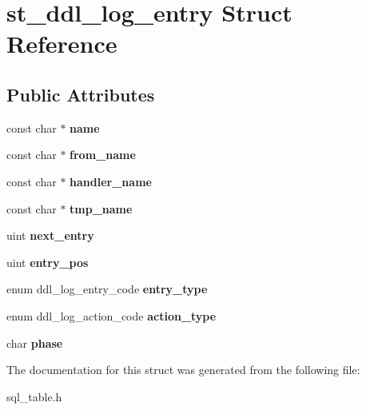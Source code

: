 \hypertarget{structst__ddl__log__entry}{}\section{st\+\_\+ddl\+\_\+log\+\_\+entry Struct Reference}
\label{structst__ddl__log__entry}
\subsection*{Public Attributes}
\begin{DoxyCompactItemize}
\item 
\mbox{\label{structst__ddl__log__entry_affc66eabbd1ef994512cfb2c076d873c}} 
const char $\ast$ {\bfseries name}
\item 
\mbox{\label{structst__ddl__log__entry_a59c9f98eacf0200a95a8aab47ca19d33}} 
const char $\ast$ {\bfseries from\+\_\+name}
\item 
\mbox{\label{structst__ddl__log__entry_a2d3a3cd5ad56b2f9d4cee7e74e20d698}} 
const char $\ast$ {\bfseries handler\+\_\+name}
\item 
\mbox{\label{structst__ddl__log__entry_a9b46a52131200b4cf8910a3834fe592c}} 
const char $\ast$ {\bfseries tmp\+\_\+name}
\item 
\mbox{\label{structst__ddl__log__entry_a0bf4caffb2a0d3ae041b2dcdb26e52e2}} 
uint {\bfseries next\+\_\+entry}
\item 
\mbox{\label{structst__ddl__log__entry_a26677cc3246dfe5613936bd9475d4711}} 
uint {\bfseries entry\+\_\+pos}
\item 
\mbox{\label{structst__ddl__log__entry_ab755812a94d5790247ed56963641647f}} 
enum ddl\+\_\+log\+\_\+entry\+\_\+code {\bfseries entry\+\_\+type}
\item 
\mbox{\label{structst__ddl__log__entry_a879f6fb99b8c21c0cec0576ef96a67b5}} 
enum ddl\+\_\+log\+\_\+action\+\_\+code {\bfseries action\+\_\+type}
\item 
\mbox{\label{structst__ddl__log__entry_a892d0a56aa6c7a992b433663f46805fe}} 
char {\bfseries phase}
\end{DoxyCompactItemize}


The documentation for this struct was generated from the following file\+:\begin{DoxyCompactItemize}
\item 
sql\+\_\+table.\+h\end{DoxyCompactItemize}
